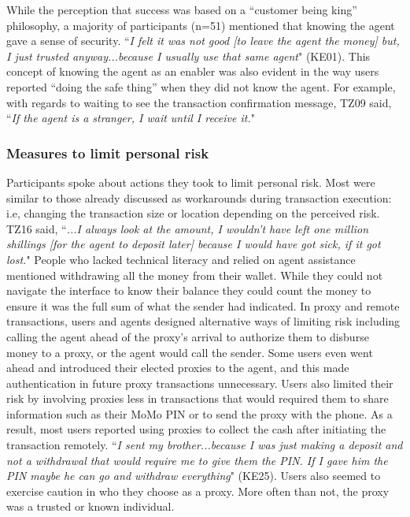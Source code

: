 While the perception that success was based on a ``customer being king'' philosophy, a majority of participants (n=51) mentioned that knowing the agent gave a sense of security. 
``\textit{I felt it was not good [to leave the agent the money] but, I just trusted anyway...because I usually use that same agent}" (KE01). This concept of knowing the agent as an enabler was also evident in the way users reported ``doing the safe thing'' when they did not know the agent. For example, with regards to waiting to see the transaction confirmation message, TZ09  said, ``\textit{If the agent is a stranger, I wait until I receive it.}"

\subsubsection{Measures to limit personal risk}Participants spoke about actions they took to limit personal risk. Most were similar to those already discussed as workarounds during transaction execution: i.e, changing the transaction size or location depending on the perceived risk.
TZ16 said, ``\textit{...I always look at the amount, I wouldn’t have left one million shillings [for the agent to deposit later] because I would have got sick, if it got lost.}" People who lacked technical literacy and relied on agent assistance mentioned withdrawing all the money from their wallet. While they could not navigate the interface to know their balance they could count the money to ensure it was the full sum of what the sender had indicated. In proxy and remote transactions, users and agents designed alternative ways of limiting risk including calling the agent ahead of the proxy's arrival to authorize them to disburse money to a proxy, or the agent would call the sender. Some users even went ahead and introduced their elected proxies to the agent, and this made authentication in future proxy transactions unnecessary. Users also limited their risk by involving proxies less in transactions that would required them to share information such as their MoMo PIN or to send the proxy with the phone. As a result, most users reported using proxies to collect the cash after initiating the transaction remotely. ``\textit{I sent my brother...because I was just making a deposit and not a withdrawal that would require me to give them the PIN. If I gave him the PIN maybe he can go and withdraw everything}" (KE25). Users also seemed to exercise caution in who they choose as a proxy. More often than not, the proxy was a trusted or known individual.

